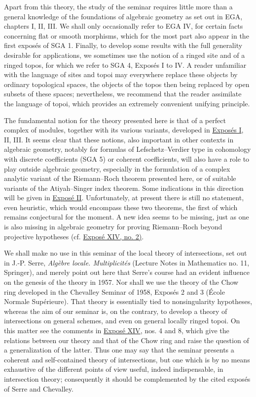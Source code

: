 Apart from this theory, the study of the seminar requires little more than a general knowledge of the foundations of algebraic geometry as set out in EGA, chapters I, II, III. We shall only occasionally refer to EGA IV, for certain facts concerning flat or smooth morphisms, which for the most part also appear in the first exposés of SGA 1. Finally, to develop some results with the full generality desirable for applications, we sometimes use the notion of a ringed site and of a ringed topos, for which we refer to SGA 4, Exposés I to IV. A reader unfamiliar with the language of sites and topoi may everywhere replace these objects by ordinary topological spaces, the objects of the topos then being replaced by open subsets of these spaces; nevertheless, we recommend that the reader assimilate the language of topoi, which provides an extremely convenient unifying principle.

The fundamental notion for the theory presented here is that of a perfect complex of modules, together with its various variants, developed in \hyperlink{sga6.e01.expose}{Exposés I}, II, III. It seems clear that these notions, also important in other contexts in algebraic geometry, notably for formulas of Lefschetz--Verdier type in cohomology with discrete coefficients (SGA 5) or coherent coefficients, will also have a role to play outside algebraic geometry, especially in the formulation of a complex analytic variant of the Riemann--Roch theorem presented here, or of suitable variants of the Atiyah--Singer index theorem. Some indications in this direction will be given in \hyperlink{sga6.e02.expose}{Exposé II}. Unfortunately, at present there is still no statement, even heuristic, which would encompass these two theorems, the first of which remains conjectural for the moment. A new idea seems to be missing, just as one is also missing in algebraic geometry for proving Riemann--Roch beyond projective hypotheses (cf. \hyperlink{sga6.e14.sec.2}{Exposé XIV, no. 2)}.

We shall make no use in this seminar of the local theory of intersections, set out in J.-P. Serre, \emph{Algèbre locale. Multiplicités} (Lecture Notes in Mathematics no. 11, Springer), and merely point out here that Serre's course had an evident influence on the genesis of the theory in 1957. Nor shall we use the theory of the Chow ring developed in the Chevalley Seminar of 1958, Exposés 2 and 3 (École Normale Supérieure). That theory is essentially tied to nonsingularity hypotheses, whereas the aim of our seminar is, on the contrary, to develop a theory of intersections on general schemes, and even on general locally ringed topoi. On this matter see the comments in \hyperlink{sga6.e14.expose}{Exposé XIV}, nos. 4 and 8, which give the relations between our theory and that of the Chow ring and raise the question of a generalization of the latter. Thus one may say that the seminar presents a coherent and self-contained theory of intersections, but one which is by no means exhaustive of the different points of view useful, indeed indispensable, in intersection theory; consequently it should be complemented by the cited exposés of Serre and Chevalley.

